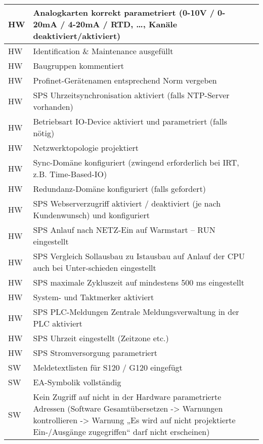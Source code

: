 \begin{longtable}{| p{} | p{} | p{} |}
        \hline
        HW & Analogkarten korrekt parametriert (0-10V / 0-20mA / 4-20mA / RTD, …, Kanäle deaktiviert/aktiviert) &  \\
        \hline
        HW & Identification \& Maintenance ausgefüllt &  \\
        \hline
        HW & Baugruppen kommentiert &  \\
        \hline
        HW & Profinet-Gerätenamen entsprechend Norm vergeben &  \\
        \hline
        HW & SPS Uhrzeitsynchronisation aktiviert (falls NTP-Server vorhanden) &  \\
        \hline
        HW & Betriebsart IO-Device aktiviert und parametriert (falls nötig) &  \\
        \hline
        HW & Netzwerktopologie projektiert  &  \\
        \hline
        HW & Sync-Domäne konfiguriert (zwingend erforderlich bei IRT, z.B. Time-Based-IO) &  \\
        \hline
        HW & Redundanz-Domäne konfiguriert (falls gefordert) &  \\
        \hline
        HW & SPS Webserverzugriff aktiviert / deaktiviert (je nach Kundenwunsch) und konfiguriert &  \\
        \hline
        HW & SPS Anlauf nach NETZ-Ein auf Warmstart – RUN eingestellt &  \\
        \hline
        HW & SPS Vergleich Sollausbau zu Istausbau auf Anlauf der CPU auch bei Unter-schieden eingestellt &  \\
        \hline
        HW & SPS maximale Zykluszeit auf mindestens 500 ms eingestellt &  \\
        \hline
        HW & System- und Taktmerker aktiviert &  \\
        \hline
        HW & SPS PLC-Meldungen Zentrale Meldungsverwaltung in der PLC aktiviert &  \\
        \hline
        HW & SPS Uhrzeit eingestellt (Zeitzone etc.) &  \\
        \hline
        HW & SPS Stromversorgung parametriert &  \\
        \hline
        SW & Meldetextlisten für S120 / G120 eingefügt &  \\
        \hline
        SW & EA-Symbolik vollständig &  \\
        \hline
        SW & Kein Zugriff auf nicht in der Hardware parametrierte Adressen 
        (Software Gesamtübersetzen -> Warnungen kontrollieren -> Warnung „Es wird auf nicht projektierte Ein-/Ausgänge zugegriffen“ darf nicht erscheinen)

\end{longtable}
